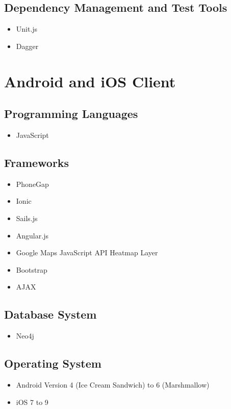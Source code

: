 \documentclass[11pt,fleqn]{book} %
\begin{document}
		\subsection{Dependency Management and Test Tools}
			\begin{itemize}
				\item Unit.js
				\item Dagger
			\end{itemize}
	\section{Android and iOS Client}
		\subsection{Programming Languages}
			\begin{itemize}
				\item JavaScript
			\end{itemize}
		\subsection{Frameworks}
			\begin{itemize}
				\item PhoneGap
				\item Ionic
				\item Sails.js
				\item Angular.js
				\item Google Maps JavaScript API Heatmap Layer
				\item Bootstrap
				\item AJAX					
			\end{itemize}
		\subsection{Database System}
			\begin{itemize}
				\item Neo4j
			\end{itemize}
		\subsection{Operating System}
			\begin{itemize}
				\item Android Version 4 (Ice Cream Sandwich) to 6 (Marshmallow)
				\item iOS 7 to 9				
			\end{itemize}
\end{document}
